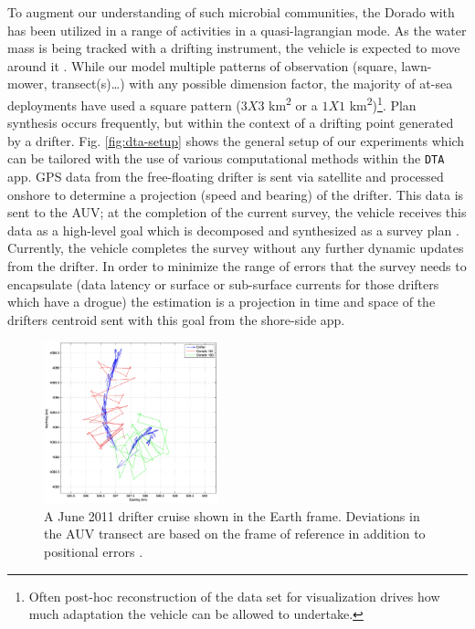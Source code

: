 To augment our understanding of such microbial communities, the Dorado
with \rx has been utilized in a range of activities in a
quasi-lagrangian mode. As the water mass is being tracked with a
drifting instrument, the vehicle is expected to move around it
. While our
model  multiple patterns of observation (square,
lawn-mower, transect(s)\dots) with any possible dimension factor, the
majority of at-sea deployments have used a square pattern ($3X3$
km\textsuperscript{2} or a $1X1$ km\textsuperscript{2})\footnote{Often
  post-hoc reconstruction of the data set for visualization drives how
  much adaptation the vehicle can be allowed to undertake.}. Plan
synthesis occurs frequently, but within the context of a drifting
point generated by a drifter. 
Fig. \ref{fig:dta-setup} shows the general setup of our experiments
which can be tailored with the use of various computational methods
within the \texttt{DTA} app. GPS data from the free-floating drifter
is sent via satellite and processed onshore to determine a projection
(speed and bearing) of the drifter. This data is sent to the AUV; at
the completion of the current survey, the vehicle receives this data
as a high-level goal which is decomposed and synthesized as a survey
plan . Currently, the vehicle
completes the survey without any further dynamic updates from the
drifter. In order to minimize the range of errors that the survey
needs to encapsulate (data latency or surface or sub-surface currents
for those drifters which have a drogue) the estimation is a projection
in time and space of the drifters centroid sent with this goal from
the shore-side app.

\begin{figure}[!t]
\centering
\includegraphics[width=0.45\textwidth]{figs/june11-drifter-follow-180-181.jpeg}
\caption{\small{A June 2011 drifter cruise shown in the Earth
    frame. Deviations in the AUV transect are based on the frame of
    reference in addition to positional errors \cite{das11b}.}}
\label{fig:drifter-errors}
\end{figure}

